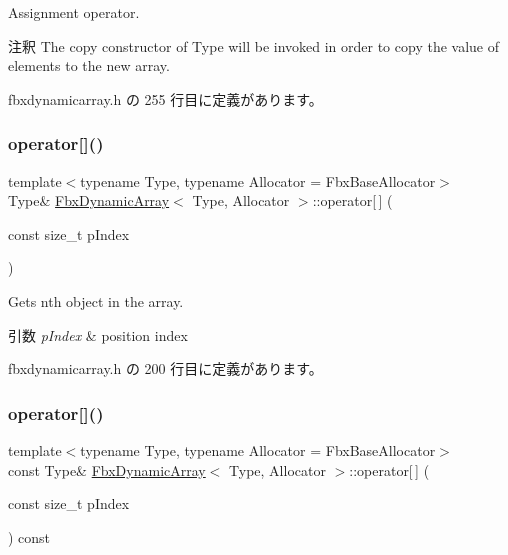 Assignment operator. \begin{DoxyRemark}{注釈}
The copy constructor of {\ttfamily Type} will be invoked in order to copy the value of elements to the new array. 
\end{DoxyRemark}


 fbxdynamicarray.\+h の 255 行目に定義があります。

\mbox{\label{class_fbx_dynamic_array_a94ce9d01d2bd94e209b0b5bb02d8cd49}} 
\subsubsection{\texorpdfstring{operator[]()}{operator[]()}\hspace{0.1cm}{\footnotesize\ttfamily [1/2]}}
{\footnotesize\ttfamily template$<$typename Type, typename Allocator = Fbx\+Base\+Allocator$>$ \\
Type\& \hyperlink{class_fbx_dynamic_array}{Fbx\+Dynamic\+Array}$<$ Type, Allocator $>$\+::operator\mbox{[}$\,$\mbox{]} (\begin{DoxyParamCaption}\item[{const size\+\_\+t}]{p\+Index }\end{DoxyParamCaption})\hspace{0.3cm}{\ttfamily [inline]}}

Gets nth object in the array. 
\begin{DoxyParams}{引数}
{\em p\+Index} & position index \\
\hline
\end{DoxyParams}


 fbxdynamicarray.\+h の 200 行目に定義があります。

\mbox{\label{class_fbx_dynamic_array_ada7506435417b4811a85f85706e9ecb9}} 
\subsubsection{\texorpdfstring{operator[]()}{operator[]()}\hspace{0.1cm}{\footnotesize\ttfamily [2/2]}}
{\footnotesize\ttfamily template$<$typename Type, typename Allocator = Fbx\+Base\+Allocator$>$ \\
const Type\& \hyperlink{class_fbx_dynamic_array}{Fbx\+Dynamic\+Array}$<$ Type, Allocator $>$\+::operator\mbox{[}$\,$\mbox{]} (\begin{DoxyParamCaption}\item[{const size\+\_\+t}]{p\+Index }\end{DoxyParamCaption}) const\hspace{0.3cm}{\ttfamily [inline]}}


